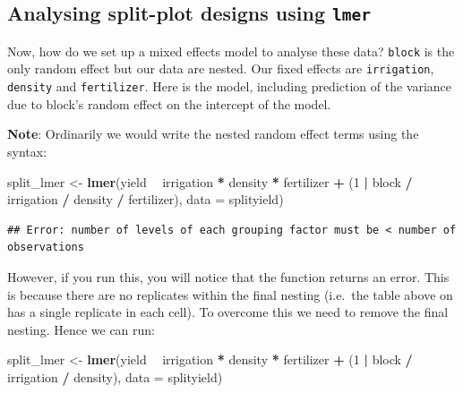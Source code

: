 \documentclass[]{book}
\newenvironment{Shaded}{\begin{snugshade}}{\end{snugshade}}
\newcommand{\KeywordTok}[1]{\textcolor[rgb]{0.13,0.29,0.53}{\textbf{#1}}}
\newcommand{\DataTypeTok}[1]{\textcolor[rgb]{0.13,0.29,0.53}{#1}}
\newcommand{\DecValTok}[1]{\textcolor[rgb]{0.00,0.00,0.81}{#1}}
\newcommand{\StringTok}[1]{\textcolor[rgb]{0.31,0.60,0.02}{#1}}
\newcommand{\OperatorTok}[1]{\textcolor[rgb]{0.81,0.36,0.00}{\textbf{#1}}}
\newcommand{\NormalTok}[1]{#1}
\theoremstyle{definition}
\theoremstyle{definition}
\theoremstyle{definition}
\theoremstyle{remark}
\begin{document}
\subsection{\texorpdfstring{Analysing split-plot designs using
\texttt{lmer}}{Analysing split-plot designs using lmer}}\label{analysing-split-plot-designs-using-lmer}

Now, how do we set up a mixed effects model to analyse these data?
\texttt{block} is the only random effect but our data are nested. Our
fixed effects are \texttt{irrigation}, \texttt{density} and
\texttt{fertilizer}. Here is the model, including prediction of the
variance due to block's random effect on the intercept of the model.

\textbf{Note}: Ordinarily we would write the nested random effect terms
using the syntax:

\begin{Shaded}
\begin{Highlighting}[]
\NormalTok{split_lmer <-}\StringTok{ }\KeywordTok{lmer}\NormalTok{(yield }\OperatorTok{~}\StringTok{ }\NormalTok{irrigation }\OperatorTok{*}\StringTok{ }\NormalTok{density }\OperatorTok{*}\StringTok{ }\NormalTok{fertilizer }\OperatorTok{+}\StringTok{ }
\StringTok{                       }\NormalTok{(}\DecValTok{1} \OperatorTok{|}\StringTok{ }\NormalTok{block }\OperatorTok{/}\StringTok{ }\NormalTok{irrigation }\OperatorTok{/}\StringTok{ }\NormalTok{density }\OperatorTok{/}\StringTok{ }\NormalTok{fertilizer), }\DataTypeTok{data =}\NormalTok{ splityield)}
\end{Highlighting}
\end{Shaded}

\begin{verbatim}
## Error: number of levels of each grouping factor must be < number of observations
\end{verbatim}

However, if you run this, you will notice that the function returns an
error. This is because there are no replicates within the final nesting
(i.e.~the table above on has a single replicate in each cell). To
overcome this we need to remove the final nesting. Hence we can run:

\begin{Shaded}
\begin{Highlighting}[]
\NormalTok{split_lmer <-}\StringTok{ }\KeywordTok{lmer}\NormalTok{(yield }\OperatorTok{~}\StringTok{ }\NormalTok{irrigation }\OperatorTok{*}\StringTok{ }\NormalTok{density }\OperatorTok{*}\StringTok{ }\NormalTok{fertilizer }\OperatorTok{+}\StringTok{ }
\StringTok{                       }\NormalTok{(}\DecValTok{1} \OperatorTok{|}\StringTok{ }\NormalTok{block }\OperatorTok{/}\StringTok{ }\NormalTok{irrigation }\OperatorTok{/}\StringTok{ }\NormalTok{density), }\DataTypeTok{data =}\NormalTok{ splityield)}
\end{Highlighting}
\end{Shaded}
\end{document}
